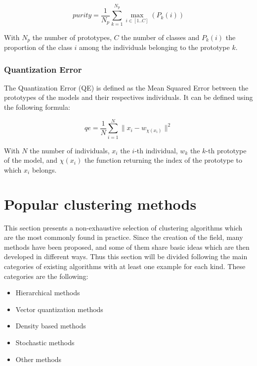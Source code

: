     \begin{equation}
        purity = \frac{1}{N_p}\sum_{k=1}^{N_p} \max_{i \in \left[ 1..C  
        \right]}\left( P_k(i) \right)
    \end{equation}

    With $N_p$ the number of prototypes, $C$ the number of classes and $P_k(i)$ the 
    proportion of the class $i$ among the individuals belonging to the prototype 
    $k$.

    \subsubsection{Quantization Error}
    \label{sec:survey_qe}

    The Quantization Error (QE) is defined as the Mean Squared Error between the 
    prototypes of the models and their respectives individuals. It can be 
    defined using the following formula:

    \begin{equation}
\label{eq:som_qe}
    qe = \frac{1}{N}\sum_{i=1}^{N}\|x_i - w_{\chi(x_i)}\|^2
	\end{equation}
    
    With $N$ the number of individuals, $x_i$ the $i$-th individual, $w_k$ the 
    $k$-th prototype of the model, and $\chi(x_i)$ the function returning the 
    index of the prototype to which $x_i$ belongs.

\section{Popular clustering methods}

    This section presents a non-exhaustive selection of clustering algorithms which are the most commonly found in practice. Since the creation of the field, many methods have been proposed, and some of them share basic ideas which are then developed in different ways. Thus this section will be divided following the main categories of existing algorithms with at least one example for each kind. These categories are the following:

    \begin{itemize}
        \item Hierarchical methods
        \item Vector quantization methods
        \item Density based methods
        \item Stochastic methods
        \item Other methods 
    \end{itemize}

